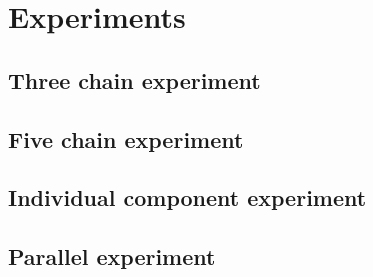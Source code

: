 \chapter{Experiments}
\label{chap:experiments}

\section{Three chain experiment}
\section{Five chain experiment}
\section{Individual component experiment}
\section{Parallel experiment}


